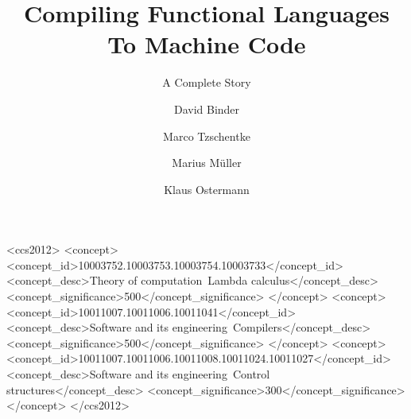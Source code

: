 \documentclass[nonacm]{acmart}
\begin{document}
\title{Compiling Functional Languages To Machine Code}
\subtitle{A Complete Story}



\begin{CCSXML}
  <ccs2012>
     <concept>
         <concept_id>10003752.10003753.10003754.10003733</concept_id>
         <concept_desc>Theory of computation~Lambda calculus</concept_desc>
         <concept_significance>500</concept_significance>
         </concept>
     <concept>
         <concept_id>10011007.10011006.10011041</concept_id>
         <concept_desc>Software and its engineering~Compilers</concept_desc>
         <concept_significance>500</concept_significance>
         </concept>
     <concept>
         <concept_id>10011007.10011006.10011008.10011024.10011027</concept_id>
         <concept_desc>Software and its engineering~Control structures</concept_desc>
         <concept_significance>300</concept_significance>
         </concept>
   </ccs2012>
\end{CCSXML}
  

\author{David Binder}

\author{Marco Tzschentke}

\author{Marius Müller}

\author{Klaus Ostermann}
\end{document}

